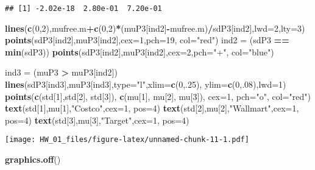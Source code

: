 \documentclass[]{article}
\newenvironment{Shaded}{\begin{snugshade}}{\end{snugshade}}
\newcommand{\DataTypeTok}[1]{\textcolor[rgb]{0.13,0.29,0.53}{#1}}
\newcommand{\DecValTok}[1]{\textcolor[rgb]{0.00,0.00,0.81}{#1}}
\newcommand{\KeywordTok}[1]{\textcolor[rgb]{0.13,0.29,0.53}{\textbf{#1}}}
\newcommand{\NormalTok}[1]{#1}
\newcommand{\OperatorTok}[1]{\textcolor[rgb]{0.81,0.36,0.00}{\textbf{#1}}}
\newcommand{\StringTok}[1]{\textcolor[rgb]{0.31,0.60,0.02}{#1}}
\begin{document}
\begin{verbatim}
## [1] -2.02e-18  2.80e-01  7.20e-01
\end{verbatim}

\begin{Shaded}
\begin{Highlighting}[]
\KeywordTok{lines}\NormalTok{(}\KeywordTok{c}\NormalTok{(}\DecValTok{0}\NormalTok{,}\DecValTok{2}\NormalTok{),mufree.m}\OperatorTok{+}\KeywordTok{c}\NormalTok{(}\DecValTok{0}\NormalTok{,}\DecValTok{2}\NormalTok{)}\OperatorTok{*}\NormalTok{(muP3[ind2]}\OperatorTok{-}\NormalTok{mufree.m)}\OperatorTok{/}\NormalTok{sdP3[ind2],}\DataTypeTok{lwd=}\DecValTok{2}\NormalTok{,}\DataTypeTok{lty=}\DecValTok{3}\NormalTok{)}
\KeywordTok{points}\NormalTok{(sdP3[ind2],muP3[ind2],}\DataTypeTok{cex=}\DecValTok{1}\NormalTok{,}\DataTypeTok{pch=}\DecValTok{19}\NormalTok{, }\DataTypeTok{col=}\StringTok{"red"}\NormalTok{) }
\NormalTok{ind2 =}\StringTok{ }\NormalTok{(sdP3 }\OperatorTok{==}\StringTok{ }\KeywordTok{min}\NormalTok{(sdP3)) }
\KeywordTok{points}\NormalTok{(sdP3[ind2],muP3[ind2],}\DataTypeTok{cex=}\DecValTok{2}\NormalTok{,}\DataTypeTok{pch=}\StringTok{"+"}\NormalTok{, }\DataTypeTok{col=}\StringTok{"blue"}\NormalTok{) }

\NormalTok{ind3 =}\StringTok{ }\NormalTok{(muP3 }\OperatorTok{>}\StringTok{ }\NormalTok{muP3[ind2])}
\KeywordTok{lines}\NormalTok{(sdP3[ind3],muP3[ind3],}\DataTypeTok{type=}\StringTok{"l"}\NormalTok{,}\DataTypeTok{xlim=}\KeywordTok{c}\NormalTok{(}\DecValTok{0}\NormalTok{,.}\DecValTok{25}\NormalTok{),}
      \DataTypeTok{ylim=}\KeywordTok{c}\NormalTok{(}\DecValTok{0}\NormalTok{,.}\DecValTok{08}\NormalTok{),}\DataTypeTok{lwd=}\DecValTok{1}\NormalTok{) }
\KeywordTok{points}\NormalTok{(}\KeywordTok{c}\NormalTok{(std[}\DecValTok{1}\NormalTok{],std[}\DecValTok{2}\NormalTok{], std[}\DecValTok{3}\NormalTok{]), }\KeywordTok{c}\NormalTok{(mu[}\DecValTok{1}\NormalTok{], mu[}\DecValTok{2}\NormalTok{], mu[}\DecValTok{3}\NormalTok{]), }\DataTypeTok{cex=}\DecValTok{1}\NormalTok{, }\DataTypeTok{pch=}\StringTok{"o"}\NormalTok{, }\DataTypeTok{col=}\StringTok{"red"}\NormalTok{) }
\KeywordTok{text}\NormalTok{(std[}\DecValTok{1}\NormalTok{],mu[}\DecValTok{1}\NormalTok{],}\StringTok{"Costco"}\NormalTok{,}\DataTypeTok{cex=}\DecValTok{1}\NormalTok{, }\DataTypeTok{pos=}\DecValTok{4}\NormalTok{)}
\KeywordTok{text}\NormalTok{(std[}\DecValTok{2}\NormalTok{],mu[}\DecValTok{2}\NormalTok{],}\StringTok{"Wallmart"}\NormalTok{,}\DataTypeTok{cex=}\DecValTok{1}\NormalTok{, }\DataTypeTok{pos=}\DecValTok{4}\NormalTok{)}
\KeywordTok{text}\NormalTok{(std[}\DecValTok{3}\NormalTok{],mu[}\DecValTok{3}\NormalTok{],}\StringTok{"Target"}\NormalTok{,}\DataTypeTok{cex=}\DecValTok{1}\NormalTok{, }\DataTypeTok{pos=}\DecValTok{4}\NormalTok{)}
\end{Highlighting}
\end{Shaded}

\texttt{[image: HW\_01\_files/figure-latex/unnamed-chunk-11-1.pdf]}

\begin{Shaded}
\begin{Highlighting}[]
\KeywordTok{graphics.off}\NormalTok{()}
\end{Highlighting}
\end{Shaded}
\end{document}
